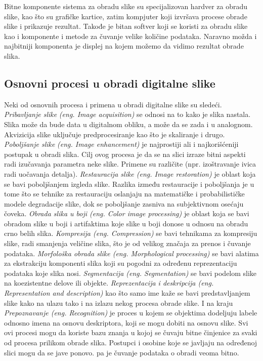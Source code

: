 \documentclass[a4paper,12pt,titlepage]{article}
\begin{document}
Bitne komponente sistema za obradu slike su specijalizovan hardver za obradu slike, kao što su grafičke kartice, zatim kompjuter koji izvršava procese obrade slike i prikazuje rezultat. Takođe je bitan softver koji se koristi za obradu slike kao i komponente i metode za čuvanje velike količine podataka. Naravno možda i najbitniji komponenta je displej na kojem možemo da vidimo rezultat obrade slika.            

\subsection{Osnovni procesi u obradi digitalne slike}%

Neki od osnovnih procesa i primena u obradi digitalne slike su sledeći. \emph{Pribavljanje slike} \emph{(eng. Image acquisition)} se odnosi na to kako je slika nastala. Slika može da bude data u digitalnom obliku, a može da se zada i u analognom. Akvizicija slike uključuje predprocesiranje kao što je skaliranje i drugo. \emph{Poboljšanje slike} \emph{(eng. Image enhancement)} je najprostiji ali i najkorišćeniji postupak u obradi slika. Cilj ovog procesa je da se na slici izraze bitni aspekti radi izučavanja parametra neke slike. Primene su različite (npr. izoštravanje ivica radi uočavanja detalja). \emph{Restauracija slike (eng. Image restoration)} je oblast koja se bavi poboljšanjem izgleda slike. Razlika između restauracije i poboljšanja je u tome što se tehnike za restauraciju oslanjaju na matematičke i probabilističke modele degradacije slike, dok se poboljšanje zasniva na subjektivnom osećaju čoveka. \emph{Obrada slika u boji (eng. Color image processing)} je oblast koja se bavi obradom slike u boji i artifaktima koje slike u boji donose u odnosu na obradu crno belih slika. \emph{Kompresija (eng. Compression)} se bavi tehnikama za kompresiju slike, radi smanjenja veličine slika, što je od velikog značaja za prenos i čuvanje podataka. \emph{Morfološka obrada slike (eng. Morphological processing)} se bavi alatima za ekstrakciju komponenti slika koji su pogodni za određenu reprezentaciju podataka koje slika nosi. \emph{Segmentacija (eng. Segmentation)} se bavi podelom slike na koezistentne delove ili objekte. \emph{Reprezentacija i deskripcija (eng. Representation and description)} kao što samo ime kaže se bavi predstavljanjem slike kako na ulazu tako i na izlazu nekog procesa obrade slike. I na kraju \emph{Prepoznavanje (eng. Recognition)} je proces u kojem se objektima dodeljuju labele odnosno imena na osnovu deskriptora, koji se mogu dobiti na osnovu slike. Svi ovi procesi mogu da koriste bazu znanja u kojoj se čuvaju bitne činjenice za svaki od procesa prilikom obrade slika. Postupci i osobine koje se javljaju na određenoj slici mogu da se jave ponovo. pa je čuvanje podataka o obradi veoma bitno.
\end{document}
